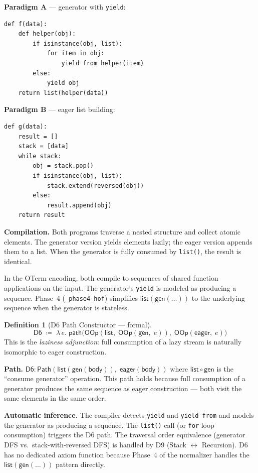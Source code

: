 \documentclass[11pt,a4paper]{report}
\theoremstyle{definition}
\newtheorem{definition}{Definition}[chapter]
\theoremstyle{plain}
\newcommand{\Path}{\mathsf{Path}}
\begin{document}
\textbf{Paradigm A} --- generator with \texttt{yield}:
\begin{lstlisting}
def f(data):
    def helper(obj):
        if isinstance(obj, list):
            for item in obj:
                yield from helper(item)
        else:
            yield obj
    return list(helper(data))
\end{lstlisting}

\textbf{Paradigm B} --- eager list building:
\begin{lstlisting}
def g(data):
    result = []
    stack = [data]
    while stack:
        obj = stack.pop()
        if isinstance(obj, list):
            stack.extend(reversed(obj))
        else:
            result.append(obj)
    return result
\end{lstlisting}

\textbf{Compilation.}
Both programs traverse a nested structure and collect atomic elements.
The generator version yields elements lazily; the eager version
appends them to a list.  When the generator is fully consumed by
\texttt{list()}, the result is identical.

In the OTerm encoding, both compile to sequences of shared function
applications on the input.  The generator's \texttt{yield} is modeled
as producing a sequence.  Phase~4 (\texttt{\_phase4\_hof}) simplifies
$\mathsf{list}(\mathsf{gen}(\ldots))$ to the underlying sequence when
the generator is stateless.

\begin{definition}[D6 Path Constructor --- formal]
\label{def:d6-path}
\[
  \mathsf{D6} \;\coloneqq\; \lambda\, e.\;
  \mathsf{path}\!\big(
    \mathsf{OOp}(\mathsf{list},\;
      \mathsf{OOp}(\mathsf{gen},\; e)),\;
    \mathsf{OOp}(\mathsf{eager},\; e)
  \big)
\]
This is the \emph{laziness adjunction}: full consumption of a lazy
stream is naturally isomorphic to eager construction.
\end{definition}

\textbf{Path.}
$\mathsf{D6} : \Path(\mathsf{list}(\mathsf{gen}(\mathsf{body})),\;
\mathsf{eager}(\mathsf{body}))$
where $\mathsf{list} \circ \mathsf{gen}$ is the ``consume generator''
operation.  This path holds because full consumption of a generator
produces the same sequence as eager construction --- both visit the
same elements in the same order.

\textbf{Automatic inference.}
The compiler detects \texttt{yield} and \texttt{yield from} and models
the generator as producing a sequence.  The \texttt{list()} call
(or \texttt{for} loop consumption) triggers the D6 path.  The
traversal order equivalence (generator DFS vs.\ stack-with-reversed
DFS) is handled by D9 (Stack $\leftrightarrow$ Recursion).  D6 has
no dedicated axiom function because Phase~4 of the normalizer handles
the $\mathsf{list}(\mathsf{gen}(\ldots))$ pattern directly.
\end{document}

